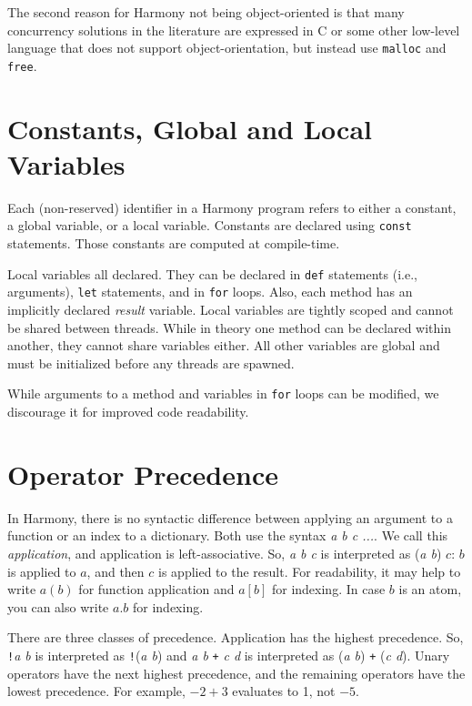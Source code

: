 \documentclass{report}
\begin{document}
The second reason for Harmony not being object-oriented is that
many concurrency solutions in the literature are
expressed in C or some other low-level language that does not support
object-orientation, but instead use \texttt{malloc} and \texttt{free}.

\section{Constants, Global and Local Variables}\label{sec:vars}

Each (non-reserved) identifier in a Harmony program refers to either
a constant, a global variable, or a local variable.
Constants are declared using \texttt{const} statements.
Those constants are computed at compile-time.

Local variables all declared.  They can be declared in
\texttt{def} statements (i.e., arguments),
\texttt{let} statements, and in \texttt{for} loops.
Also, each method has an implicitly declared
\textit{result} variable.
Local variables are tightly scoped and cannot be shared
between threads.
While in theory one method can be declared within another,
they cannot share variables either.
All other variables are global and must be initialized
before any threads are spawned.

While arguments to a method and variables in \texttt{for} loops
can be modified, we discourage it for improved code readability.

\section{Operator Precedence}

In Harmony, there is no syntactic difference between applying an argument to a function
or an index to a dictionary.  Both use the syntax \textit{a b c ...}.
We call this \emph{application}, and application is left-associative.
So, \textit{a b c} is interpreted as (\textit{a b}) $c$: $b$ is applied to $a$,
and then $c$ is applied to the result.
For readability, it may help to write $a(b)$ for function application and
$a[b]$ for indexing.  In case $b$ is an atom, you can also write $a.b$ for indexing.

There are three classes of precedence.
Application has the highest precedence.  So, \texttt{!}\textit{a b} is interpreted as
\texttt{!}(\textit{a b}) and \textit{a b} \texttt{+} \textit{c d} is interpreted as
(\textit{a b}) \texttt{+} (\textit{c d}).
Unary operators have the next highest precedence,
and the remaining operators have the lowest precedence.
For example, $-2 + 3$ evaluates to 1, not $-5$.
\end{document}
